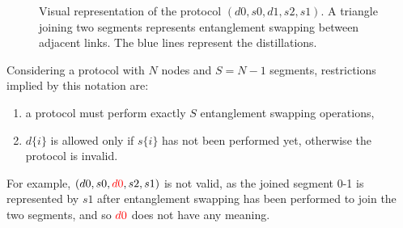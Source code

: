 \documentclass{article}
\begin{document}
\begin{figure}[ht!]
  \centering
  \caption{Visual representation of the protocol $(d0, s0, d1, s2, s1)$. A triangle joining two segments represents entanglement swapping between adjacent links. The blue lines represent the distillations.}
  \label{fig:triangle_notation}
\end{figure}

Considering a protocol with $N$ nodes and $S=N-1$ segments, restrictions implied by this notation are:
\begin{enumerate}
  \item a protocol must perform exactly $S$ entanglement swapping operations,
  \item $d\{i\}$ is allowed only if $s\{i\}$ has not been performed yet, otherwise the protocol is invalid.
\end{enumerate}

For example, $(d0, s0, \textcolor{red}{d0}, s2, s1)$ is not valid, as the joined segment 0-1 is represented by $s1$ after entanglement swapping has been performed to join the two segments, and so $\textcolor{red}{d0}$ does not have any meaning.
\end{document}
